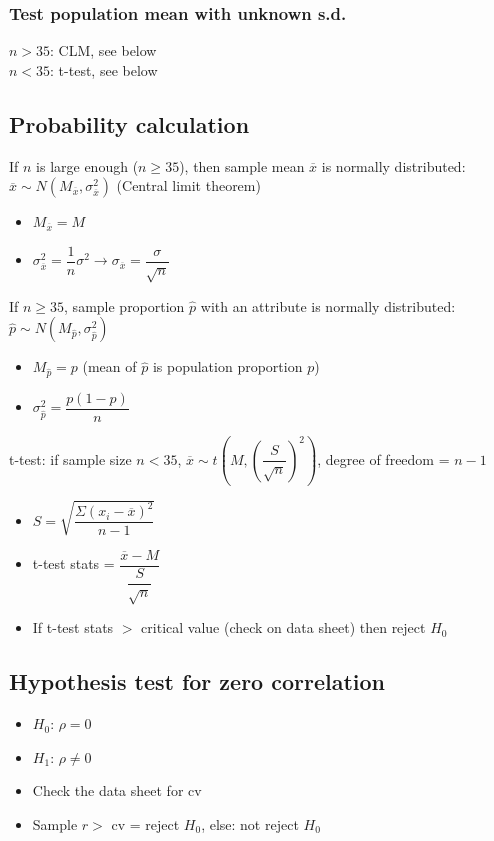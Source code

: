\documentclass[A4paper, 11pt]{article}
\begin{document}
	\subsubsection{Test population mean with unknown s.d.}
	$n>35$: CLM, see below\\
	$n<35$: t-test, see below
	
	\subsection{Probability calculation}
	If $n$ is large enough ($n\geq35$), then sample mean $\overline{x}$ is normally distributed: $\overline{x} \sim N(M_{\overline{x}}, \sigma_{\overline{x}}^2)$ (Central limit theorem)
	\begin{itemize}
		\item $M_{\overline{x}}=M$
		\item $\sigma_{\overline{x}}^2=\dfrac{1}{n}\sigma^2 \rightarrow \sigma_{\overline{x}} = \dfrac{\sigma}{\sqrt{n}}$
	\end{itemize}
	If $n\geq35$, sample proportion $\hat{p}$ with an attribute is normally distributed: $\hat{p}\sim N(M_{\hat{p}}, \sigma_{\hat{p}}^2)$
	\begin{itemize}
		\item $M_{\hat{p}}=p$ (mean of $\hat{p}$ is population proportion $p$)
		\item $\sigma_{\hat{p}}^2=\dfrac{p(1-p)}{n}$
	\end{itemize}
	t-test: if sample size $n<35$, $\overline{x} \sim t(M, (\dfrac{S}{\sqrt{n}})^2)$, degree of freedom = $n-1$
	\begin{itemize}
		\item $S=\sqrt{\dfrac{\Sigma (x_i-\overline{x})^2}{n-1}}$
		\item t-test stats = $\dfrac{\overline{x}-M}{\dfrac{S}{\sqrt{n}}}$
		\item If t-test stats $>$ critical value (check on data sheet) then reject $H_0$
	\end{itemize}
	
	\subsection{Hypothesis test for zero correlation}
	\begin{itemize}
		\item $H_0$: $\rho = 0$
		\item $H_1$: $\rho \neq 0$
		\item Check the data sheet for cv
		\item Sample $r >$ cv = reject $H_0$, else: not reject $H_0$
	\end{itemize}
	
\end{document}
